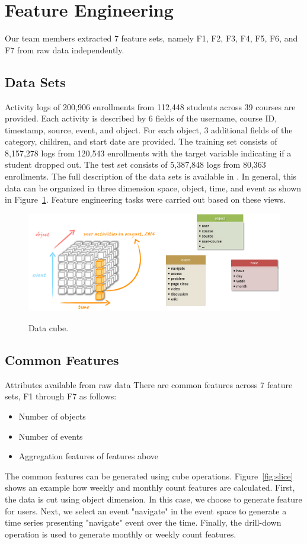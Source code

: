\section{Feature Engineering}
Our team members extracted 7 feature sets, namely F1, F2, F3, F4, F5, F6, and F7 from raw data independently.

\subsection{Data Sets}
Activity logs of 200,906 enrollments from 112,448 students across 39 courses are provided.
Each activity is described by 6 fields of the username, course ID, timestamp, source, event, and object. 
For each object, 3 additional fields of the category, children, and start date are provided.
The training set consists of 8,157,278 logs from 120,543 enrollments with the target variable indicating if a student dropped out.  
The test set consists of 5,387,848 logs from 80,363 enrollments.
The full description of the data sets is available in \cite{kddcup2015_data}. In general, this data can be organized in three dimension space, object, time, and event as shown in Figure~\ref{fig:cube}. Feature engineering tasks were carried out based on these views.

\begin{figure}[!t]
	\centering
	\includegraphics[width=0.5 \textwidth]{cube}
	\label{fig:cube}
	\caption{Data cube.}
\end{figure}


\subsection{Common Features}
Attributes available from raw data
There are common features across 7 feature sets, F1 through F7 as follows:
\begin{itemize}
	\item Number of objects
	\item Number of events
	\item Aggregation features of features above
\end{itemize}
The common features can be generated using cube operations. Figure~\ref{fig:slice} shows an example how weekly and monthly count features are calculated. First, the data is cut using object dimension. In this case, we choose to generate feature for users. Next, we select an event "navigate" in the event space to generate a time series presenting "navigate" event over the time. Finally, the drill-down operation is used to generate monthly or weekly count features.

